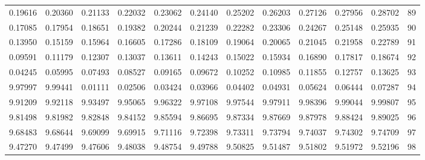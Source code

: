 \begin{center}
\begin{tabular}{|rrrrrrrrrrr|r|}
0.19616&0.20360&0.21133&0.22032&0.23062&0.24140&0.25202&0.26203&0.27126&0.27956&0.28702&89\\[5pt]
0.17085&0.17954&0.18651&0.19382&0.20244&0.21239&0.22282&0.23306&0.24267&0.25148&0.25935&90\\
0.13950&0.15159&0.15964&0.16605&0.17286&0.18109&0.19064&0.20065&0.21045&0.21958&0.22789&91\\
0.09591&0.11179&0.12307&0.13037&0.13611&0.14243&0.15022&0.15934&0.16890&0.17817&0.18674&92\\
0.04245&0.05995&0.07493&0.08527&0.09165&0.09672&0.10252&0.10985&0.11855&0.12757&0.13625&93\\
9.97997&9.99441&0.01111&0.02506&0.03424&0.03966&0.04402&0.04931&0.05624&0.06444&0.07287&94\\[5pt]
9.91209&9.92118&9.93497&9.95065&9.96322&9.97108&9.97544&9.97911&9.98396&9.99044&9.99807&95\\
9.81498&9.81982&9.82848&9.84152&9.85594&9.86695&9.87334&9.87669&9.87978&9.88424&9.89025&96\\
9.68483&9.68644&9.69099&9.69915&9.71116&9.72398&9.73311&9.73794&9.74037&9.74302&9.74709&97\\
9.47270&9.47499&9.47606&9.48038&9.48754&9.49788&9.50825&9.51487&9.51802&9.51972&9.52196&98\\
\hline\end{tabular}
\end{center}
